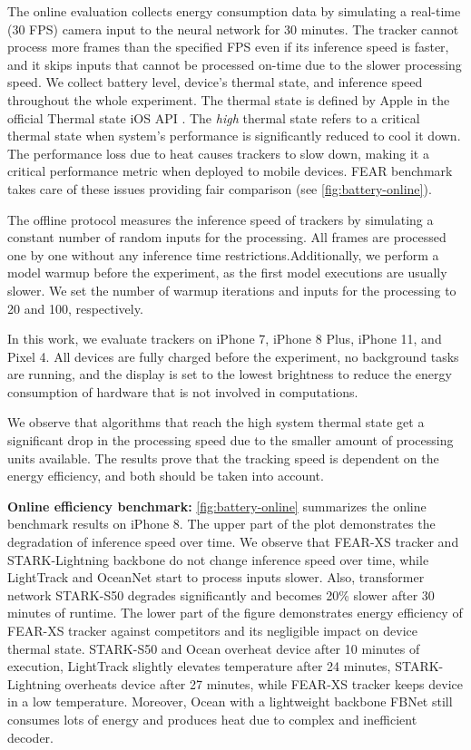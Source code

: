 \documentclass[runningheads]{llncs}
\begin{document}
The online evaluation collects energy consumption data by simulating a real-time (30 FPS) camera input to the neural network for 30 minutes.
The tracker cannot process more frames than the specified FPS even if its inference speed is faster, and it skips inputs that cannot be processed on-time due to the slower processing speed. 
We collect battery level, device's thermal state, and inference speed throughout the whole experiment. 
The thermal state is defined by Apple in the official Thermal state iOS API \cite{thermalstate}. 
The \textit{high} thermal state refers to a critical thermal state when system's performance is significantly reduced to cool it down.
The performance loss due to heat causes trackers to slow down, making it a critical performance metric when deployed to mobile devices.
FEAR benchmark takes care of these issues providing fair comparison (see \cref{fig:battery-online}).

The offline protocol measures the inference speed of trackers by simulating a constant number of random inputs for the processing.
All frames are processed one by one without any inference time restrictions.Additionally, we perform a model warmup before the experiment, as the first model executions are usually slower. We set the number of warmup iterations and inputs for the processing to 20 and 100, respectively.

In this work, we evaluate trackers on iPhone 7, iPhone 8 Plus, iPhone 11, and Pixel 4. All devices are fully charged before the experiment, no background tasks are running, and the display is set to the lowest brightness to reduce the energy consumption of hardware that is not involved in computations.

We observe that algorithms that reach the high system thermal state get a significant drop in the processing speed due to the smaller amount of processing units available. The results prove that the tracking speed is dependent on the energy efficiency, and both should be taken into account. 

\textbf{Online efficiency benchmark:} \cref{fig:battery-online} summarizes the online benchmark results on iPhone 8. The upper part of the plot demonstrates the degradation of inference speed over time. We observe that FEAR-XS tracker and STARK-Lightning \cite{stark_lightning} backbone do not change inference speed over time, while LightTrack \cite{LightTrack} and OceanNet \cite{Ocean} start to process inputs slower. Also, transformer network STARK-S50 degrades significantly and becomes 20\% slower after 30 minutes of runtime. The lower part of the figure demonstrates energy efficiency of FEAR-XS tracker against competitors and its negligible impact on device thermal state. STARK-S50 and Ocean overheat device after 10 minutes of execution, LightTrack slightly elevates temperature after 24 minutes, STARK-Lightning overheats device after 27 minutes, while FEAR-XS tracker keeps device in a low temperature. Moreover, Ocean with a lightweight backbone FBNet \cite{FBNet} still consumes lots of energy and produces heat due to complex and inefficient decoder.
\end{document}
